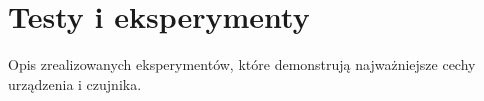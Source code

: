 \chapter[Testy i eksperymenty]{Testy i eksperymenty}

\label{testy}

Opis zrealizowanych eksperymentów, które demonstrują
najważniejsze cechy urządzenia i czujnika.

